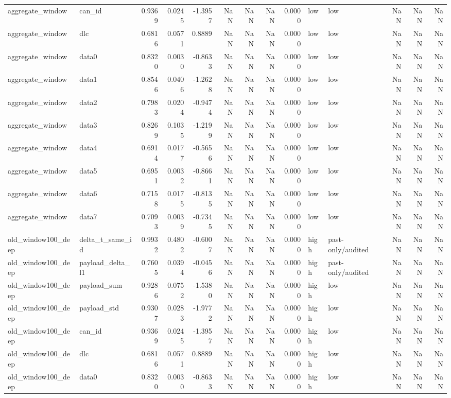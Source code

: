 \begin{tabular}{llrrrrrrrllrrr}
aggregate_window & can_id & 0.9369 & 0.0245 & -1.3957 & NaN & NaN & NaN & 0.0000 & low & low & NaN & NaN & NaN \\
aggregate_window & dlc & 0.6816 & 0.0571 & 0.8889 & NaN & NaN & NaN & 0.0000 & low & low & NaN & NaN & NaN \\
aggregate_window & data0 & 0.8320 & 0.0030 & -0.8633 & NaN & NaN & NaN & 0.0000 & low & low & NaN & NaN & NaN \\
aggregate_window & data1 & 0.8546 & 0.0406 & -1.2628 & NaN & NaN & NaN & 0.0000 & low & low & NaN & NaN & NaN \\
aggregate_window & data2 & 0.7983 & 0.0204 & -0.9474 & NaN & NaN & NaN & 0.0000 & low & low & NaN & NaN & NaN \\
aggregate_window & data3 & 0.8269 & 0.1035 & -1.2199 & NaN & NaN & NaN & 0.0000 & low & low & NaN & NaN & NaN \\
aggregate_window & data4 & 0.6914 & 0.0177 & -0.5656 & NaN & NaN & NaN & 0.0000 & low & low & NaN & NaN & NaN \\
aggregate_window & data5 & 0.6951 & 0.0032 & -0.8661 & NaN & NaN & NaN & 0.0000 & low & low & NaN & NaN & NaN \\
aggregate_window & data6 & 0.7158 & 0.0175 & -0.8135 & NaN & NaN & NaN & 0.0000 & low & low & NaN & NaN & NaN \\
aggregate_window & data7 & 0.7093 & 0.0039 & -0.7345 & NaN & NaN & NaN & 0.0000 & low & low & NaN & NaN & NaN \\
old_window100_deep & delta_t_same_id & 0.9932 & 0.4802 & -0.6007 & NaN & NaN & NaN & 0.0000 & high & past-only/audited & NaN & NaN & NaN \\
old_window100_deep & payload_delta_l1 & 0.7605 & 0.0394 & -0.0456 & NaN & NaN & NaN & 0.0000 & high & past-only/audited & NaN & NaN & NaN \\
old_window100_deep & payload_sum & 0.9286 & 0.0752 & -1.5380 & NaN & NaN & NaN & 0.0000 & high & low & NaN & NaN & NaN \\
old_window100_deep & payload_std & 0.9307 & 0.0283 & -1.9772 & NaN & NaN & NaN & 0.0000 & high & low & NaN & NaN & NaN \\
old_window100_deep & can_id & 0.9369 & 0.0245 & -1.3957 & NaN & NaN & NaN & 0.0000 & high & low & NaN & NaN & NaN \\
old_window100_deep & dlc & 0.6816 & 0.0571 & 0.8889 & NaN & NaN & NaN & 0.0000 & high & low & NaN & NaN & NaN \\
old_window100_deep & data0 & 0.8320 & 0.0030 & -0.8633 & NaN & NaN & NaN & 0.0000 & high & low & NaN & NaN & NaN \\

\end{tabular}
